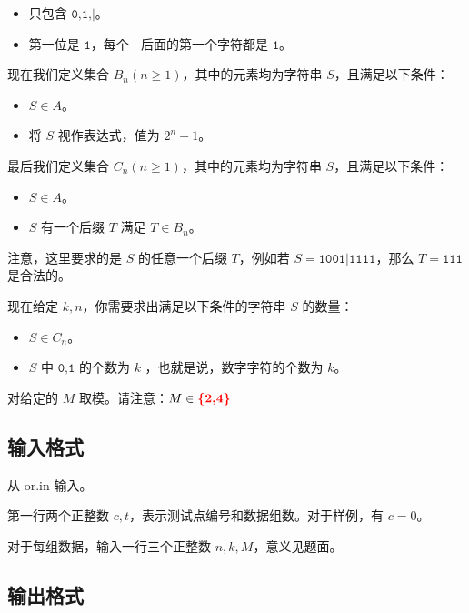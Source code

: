 \documentclass[12pt,a4paper,oneside]{ctexart}
\begin{document}
\begin{itemize}
\item 只包含 $\texttt{0,1,|}$。

\item 第一位是 $\texttt{1}$，每个 $\texttt{|}$ 后面的第一个字符都是 $\texttt{1}$。
\end{itemize}

现在我们定义集合 $B_{n}(n \geq 1)$，其中的元素均为字符串 $S$，且满足以下条件：

\begin{itemize}
    \item $S \in A$。

    \item 将 $S$ 视作表达式，值为 $2^n-1$。
\end{itemize}

最后我们定义集合 $C_{n}(n \geq 1)$，其中的元素均为字符串 $S$，且满足以下条件：

\begin{itemize}
    \item $S \in A$。

    \item  $S$ 有一个后缀 $T$ 满足 $T \in B_{n}$。
\end{itemize}

注意，这里要求的是 $S$ 的任意一个后缀 $T$，例如若 $S=\texttt{1001|1111}$，那么 $T=\texttt{111}$ 是合法的。

现在给定 $k,n$，你需要求出满足以下条件的字符串 $S$ 的数量：

\begin{itemize}
    \item  $S \in C_{n}$。

    \item $S$ 中 $\texttt{0,1}$ 的个数为 $k$ ，也就是说，数字字符的个数为 $k$。
\end{itemize}

对给定的 $M$ 取模。请注意：$M\in \textbf{\color{red}{\{2,4\}}}$


  \subsection*{输入格式}

从 $\text{or.in}$ 输入。

第一行两个正整数 $c,t$，表示测试点编号和数据组数。对于样例，有 $c=0$。

对于每组数据，输入一行三个正整数 $n,k,M$，意义见题面。

  \subsection*{输出格式}
\end{document}
